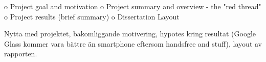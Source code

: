 o   Project goal and motivation
o   Project summary and overview - the "red thread"
o   Project results (brief summary)
o   Dissertation Layout

Nytta med projektet, bakomliggande motivering, hypotes kring resultat (Google Glass kommer vara bättre än smartphone eftersom handsfree and stuff), layout av rapporten.